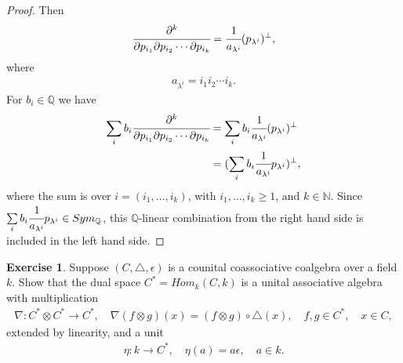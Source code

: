 \documentclass[8pt]{extarticle}
\newcommand{\N}{\mathbb{N}}
\newcommand{\Q}{\mathbb{Q}}
\newcommand{\<}{\langle}
\renewcommand{\>}{\rangle}
\theoremstyle{definition}
\newtheorem{exercise}{Exercise}
\begin{document}
\begin{proof}
  Then
  \begin{align*}
    \cfrac{\partial^k}{\partial p_{i_1} \partial p_{i_2} \cdots \partial p_{i_k}} = \cfrac{1}{a_{\lambda^i}} (p_{\lambda^i})^{\perp},
  \end{align*}
  where
  \begin{align*}
    a_{\lambda^i} = i_1 i_2 \cdots i_k.
  \end{align*}
  For $b_{i} \in \Q$ we have
  \begin{align*}
    \sum\limits_{i} b_{i}\cfrac{\partial^k}{\partial p_{i_1} \partial p_{i_2} \cdots \partial p_{i_k}}
    &=
    \sum\limits_{i} b_{i}\cfrac{1}{a_{\lambda^i}} (p_{\lambda^i})^{\perp} \\
    &=
    (\sum\limits_{i} b_{i}\cfrac{1}{a_{\lambda^i}}p_{\lambda^i})^{\perp},
  \end{align*}
  where the sum is over $i=(i_1, \dots, i_k)$, with $i_1, \dots, i_k \geq 1$, and $k \in \N$. Since $\sum\limits_{i} b_{i}\cfrac{1}{a_{\lambda^i}}p_{\lambda^i} \in Sym_{\Q}$, this $\Q$-linear combination from the right hand side is included in the left hand side.
\end{proof}
\newpage
\begin{exercise}
  Suppose $(C, \triangle, \epsilon)$ is a counital coassociative coalgebra over a field $k$. Show that the dual space $C^* = Hom_k(C,k)$ is a unital associative algebra with multiplication
  \begin{align*}
    \nabla: C^* \otimes C^* \to C^*, \quad \nabla(f \otimes g)(x) = (f \otimes g) \circ \triangle(x), \quad f, g \in C^*, \quad x \in C,
  \end{align*}
  extended by linearity, and a unit
  \begin{align*}
    \eta: k \to C^* , \quad \eta(a) = a\epsilon, \quad a \in k.
  \end{align*}
\end{exercise}
\end{document}
